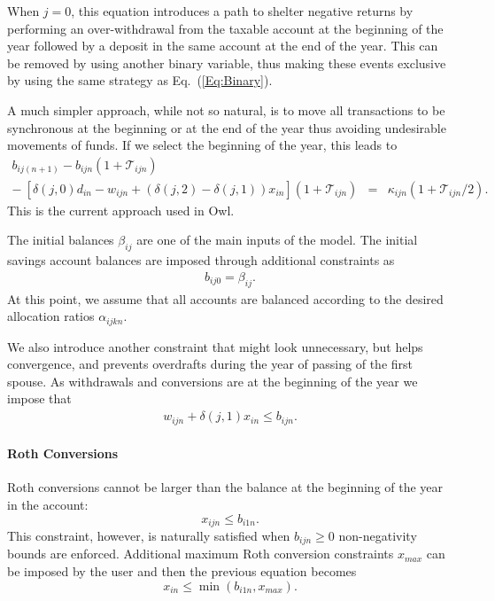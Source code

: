 \documentclass{report}[fleqn,12pt]
\begin{document}
	When $j=0$, this equation introduces
	a path to shelter negative returns by performing an over-withdrawal from the taxable
	account at the beginning of the year followed by a deposit in the
	same account at the end of the year. This can 
	be removed by using another binary variable, thus making these events exclusive by using
	the same strategy as Eq.~(\ref{Eq:Binary}).

	A much simpler approach, while not so natural,
	is to move all transactions to be synchronous at the beginning or at the end of the year
	thus avoiding undesirable movements of funds.
	If we select the beginning of the year, this leads to
	\begin{eqnarray}
		\label{Eq:C3b}
		b_{ij(n+1)} - b_{ijn}(1 + \mathcal{T}_{ijn}) 
		&& \nonumber \\
		- \ [\delta(j, 0)d_{in} - w_{ijn} + (\delta(j, 2) - \delta(j, 1))x_{in}] (1 + \mathcal{T}_{ijn})
		&=& \kappa_{ijn} (1 + \mathcal{T}_{ijn}/2).
	\end{eqnarray}
	This is the current approach used in Owl.

	The initial balances $\beta_{ij}$ are one of the main inputs of the model.
	The initial savings account balances are imposed through additional constraints as
	\begin{eqnarray}
		\label{Eq:InitialBalance}
		b_{ij0} = \beta_{ij}.
	\end{eqnarray}
	At this point, we assume that all accounts are balanced according to the desired
	allocation ratios $\alpha_{ijkn}$.

	We also introduce another constraint that might look unnecessary, but helps
	convergence, and prevents overdrafts during the year of passing of the first spouse.
	As withdrawals and conversions are at the beginning of the year 
	we impose that
	\begin{eqnarray}
		w_{ijn} + \delta(j, 1)x_{in} \le b_{ijn}.
	\end{eqnarray}

\paragraph*{Roth Conversions}
	Roth conversions cannot be larger than the balance at the beginning of the year in the account:
	\begin{equation}
		x_{ijn} \le b_{i1n}.
	\end{equation}
	This constraint, however, is naturally satisfied when $b_{ijn} \ge 0$ non-negativity bounds are enforced.
	Additional maximum Roth conversion constraints $x_{max}$ can be imposed by the user and
	then the previous equation becomes
	\begin{equation}
		x_{in} \le \min(b_{i1n}, x_{max}).
	\end{equation}
\end{document}
